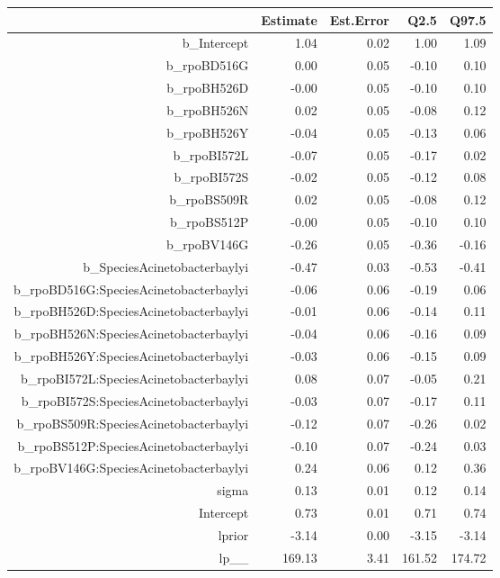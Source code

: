 \begin{table}[ht]
\centering
\begin{tabular}{rrrrr}
  \hline
 & Estimate & Est.Error & Q2.5 & Q97.5 \\ 
  \hline
b\_Intercept & 1.04 & 0.02 & 1.00 & 1.09 \\ 
  b\_rpoBD516G & 0.00 & 0.05 & -0.10 & 0.10 \\ 
  b\_rpoBH526D & -0.00 & 0.05 & -0.10 & 0.10 \\ 
  b\_rpoBH526N & 0.02 & 0.05 & -0.08 & 0.12 \\ 
  b\_rpoBH526Y & -0.04 & 0.05 & -0.13 & 0.06 \\ 
  b\_rpoBI572L & -0.07 & 0.05 & -0.17 & 0.02 \\ 
  b\_rpoBI572S & -0.02 & 0.05 & -0.12 & 0.08 \\ 
  b\_rpoBS509R & 0.02 & 0.05 & -0.08 & 0.12 \\ 
  b\_rpoBS512P & -0.00 & 0.05 & -0.10 & 0.10 \\ 
  b\_rpoBV146G & -0.26 & 0.05 & -0.36 & -0.16 \\ 
  b\_SpeciesAcinetobacterbaylyi & -0.47 & 0.03 & -0.53 & -0.41 \\ 
  b\_rpoBD516G:SpeciesAcinetobacterbaylyi & -0.06 & 0.06 & -0.19 & 0.06 \\ 
  b\_rpoBH526D:SpeciesAcinetobacterbaylyi & -0.01 & 0.06 & -0.14 & 0.11 \\ 
  b\_rpoBH526N:SpeciesAcinetobacterbaylyi & -0.04 & 0.06 & -0.16 & 0.09 \\ 
  b\_rpoBH526Y:SpeciesAcinetobacterbaylyi & -0.03 & 0.06 & -0.15 & 0.09 \\ 
  b\_rpoBI572L:SpeciesAcinetobacterbaylyi & 0.08 & 0.07 & -0.05 & 0.21 \\ 
  b\_rpoBI572S:SpeciesAcinetobacterbaylyi & -0.03 & 0.07 & -0.17 & 0.11 \\ 
  b\_rpoBS509R:SpeciesAcinetobacterbaylyi & -0.12 & 0.07 & -0.26 & 0.02 \\ 
  b\_rpoBS512P:SpeciesAcinetobacterbaylyi & -0.10 & 0.07 & -0.24 & 0.03 \\ 
  b\_rpoBV146G:SpeciesAcinetobacterbaylyi & 0.24 & 0.06 & 0.12 & 0.36 \\ 
  sigma & 0.13 & 0.01 & 0.12 & 0.14 \\ 
  Intercept & 0.73 & 0.01 & 0.71 & 0.74 \\ 
  lprior & -3.14 & 0.00 & -3.15 & -3.14 \\ 
  lp\_\_ & 169.13 & 3.41 & 161.52 & 174.72 \\ 
   \hline
\end{tabular}
\end{table}
